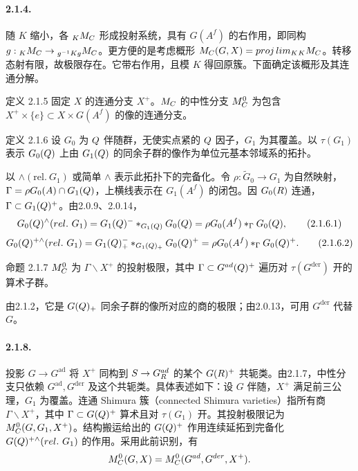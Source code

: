 \paragraph*{2.1.4.} 随 $K$ 缩小，各 ${}_KM_{C}$ 形成投射系统，具有 $G(A^f)$ 的右作用，即同构 $g:{}_KM_{C}\to{}_{g^{-1}Kg}M_{C}$。更方便的是考虑概形 $M_{C}(G,X)=proj\,lim_K{}_KM_{C}$。转移态射有限，故极限存在。它带右作用，且模 $K$ 得回原簇。下面确定该概形及其连通分解。
\begin{originaltheorem}{定义 2.1.5}
固定 $X$ 的连通分支 $X^+$。$M_{C}$ 的中性分支 $M_{C}^0$ 为包含 $X^+\times\{e\}\subset X\times G(A^f)$ 的像的连通分支。
\end{originaltheorem}
\begin{originaltheorem}{定义 2.1.6}
设 $G_0$ 为 $Q$ 伴随群，无使实点紧的 $Q$ 因子，$G_1$ 为其覆盖。以 $\tau(G_1)$ 表示 $G_0(Q)$ 上由 $G_1(Q)$ 的同余子群的像作为单位元基本邻域系的拓扑。
\end{originaltheorem}
以 $\wedge(\mathrm{rel.}\ G_1)$ 或简单 $\wedge$ 表示此拓扑下的完备化。令 $\rho:\widetilde G_0\to G_1$ 为自然映射，$\Gamma=\rho G_0(A)\cap G_1(Q)$，上横线表示在 $G_1(A^f)$ 的闭包。因 $G_0(R)$ 连通，$\Gamma\subset G_1(Q)^+$。由2.0.9、2.0.14，
\begin{equation}
 G_0(Q)^\wedge(rel.\ G_1)
 =G_1(Q)^-*_{G_1(Q)}G_0(Q)
 =\rho G_0(A^f)*_\Gamma G_0(Q),
 \tag{2.1.6.1}
\end{equation}
\begin{equation}
 G_0(Q)^{+\wedge}(rel.\ G_1)
 =G_1(Q)_+^-*_{G_1(Q)_+}G_0(Q)^+
 =\rho G_0(A^f)*_\Gamma G_0(Q)^+.
 \tag{2.1.6.2}
\end{equation}
\begin{originaltheorem}{命题 2.1.7}
$M_{C}^0$ 为 $\Gamma\backslash X^+$ 的投射极限，其中 $\Gamma\subset G^{ad}(Q)^+$ 遍历对 $\tau(G^{\mathrm{der}})$ 开的算术子群。
\end{originaltheorem}
由2.1.2，它是 $G(Q)_+$ 同余子群的像所对应的商的极限；由2.0.13，可用 $G^{\mathrm{der}}$ 代替 $G$。
\paragraph*{2.1.8.} 投影 $G\to G^{\mathrm{ad}}$ 将 $X^+$ 同构到 $S\to G_{R}^{ad}$ 的某个 $G(R)^+$ 共轭类。由2.1.7，中性分支只依赖 $G^{\mathrm{ad}},G^{\mathrm{der}}$ 及这个共轭类。具体表述如下：设 $G$ 伴随，$X^+$ 满足前三公理，$G_1$ 为覆盖。连通 Shimura 簇（connected Shimura varieties）指所有商 $\Gamma\backslash X^+$，其中 $\Gamma\subset G(Q)^+$ 算术且对 $\tau(G_1)$ 开。其投射极限记为 $M_{C}^0(G,G_1,X^+)$。结构搬运给出的 $G(Q)^+$ 作用连续延拓到完备化 $G(Q)^{+\wedge}(rel.\ G_1)$ 的作用。采用此前识别，有
\[
 M_{C}^0(G,X)=M_{C}^0(G^{ad},G^{der},X^+).
\]
